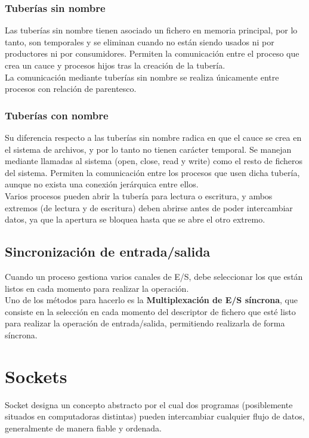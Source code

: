 \subsubsection{Tuberías sin nombre}
Las tuberías sin nombre tienen asociado un fichero en memoria principal, por lo tanto, son temporales y se eliminan cuando no están siendo usados ni por productores ni por consumidores. Permiten la comunicación entre el proceso que crea un cauce y procesos hijos tras la creación de la tubería.\\

La comunicación mediante tuberías sin nombre se realiza únicamente entre procesos con relación de parentesco.
\subsubsection{Tuberías con nombre}
Su diferencia respecto a las tuberías sin nombre radica en que el cauce se crea en el sistema de archivos, y por lo tanto no tienen carácter temporal. Se manejan mediante llamadas al sistema (open, close, read y write) como el resto de ficheros del sistema. Permiten la comunicación entre los procesos que usen dicha tubería, aunque no exista una conexión jerárquica entre ellos.\\

Varios procesos pueden abrir la tubería para lectura o escritura, y ambos extremos (de lectura y de escritura) deben abrirse antes de poder intercambiar datos, ya que la apertura se bloquea hasta que se abre el otro extremo.
\subsection{Sincronización de entrada/salida}
Cuando un proceso gestiona varios canales de E/S, debe seleccionar los que están listos en cada momento para realizar la operación.\\

Uno de los métodos para hacerlo es la \textbf{Multiplexación de E/S síncrona}, que consiste en la selección en cada momento del descriptor de fichero que esté listo para realizar la operación de entrada/salida, permitiendo realizarla de forma síncrona.

\newpage
\section{Sockets}
Socket designa un concepto abstracto por el cual dos programas (posiblemente situados en computadoras distintas) pueden intercambiar cualquier flujo de datos, generalmente de manera fiable y ordenada.\\

